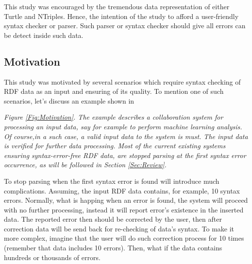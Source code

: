 \vspace{5mm} %

This study was encouraged by the tremendous data representation of either Turtle and NTriples. Hence, the intention of the study to afford a user-friendly syntax checker or parser. Such parser or syntax checker should give all errors can be detect inside such data.


			



\subsection{Motivation}

This study was motivated by several scenarios which require syntax checking of RDF data as an input and ensuring of its quality. To mention one of such scenarios, let's discuss an example shown in {\it Figure \ref{Fig:Motivation}. The example describes a collaboration system for processing an input data, say for example to perform machine learning analysis. Of course,in a such case, a valid input data to the system is must. The input data is verified for further data processing. Most of the current existing systems  ensuring syntax-error-free RDF data, are stopped parsing at the first syntax error occurrence, as will be followed in Section \ref{Sec:Review}.
	\vspace{5mm} %
	\par
	To stop parsing when the first syntax error is found will introduce much complications. Assuming, the input RDF data contains, for example, 10 syntax errors. Normally, what is happing when an error is found, the system will proceed with no further processing, instead it will report error's existence in the inserted data. The reported error then should be corrected by the user, then after correction data will be send back for re-checking of data's syntax. To make it more complex, imagine that the user will do such correction process for 10 times (remember that data includes 10 errors). Then, what if the data contains hundreds or thousands of errors. 

}
